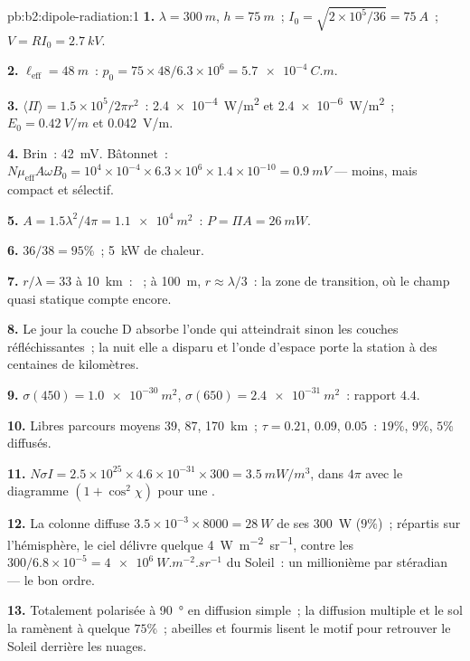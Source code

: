 \begin{solution}{pb:b2:dipole-radiation:1}
\textbf{1.} $\lambda = \qty{300}{m}$, $h = \qty{75}{m}$~; $I_0 = \sqrt{2 \times 10^5/36} = \qty{75}{A}$~;
$V = RI_0 = \qty{2.7}{kV}$.

\textbf{2.} $\ell_{\text{eff}} = \qty{48}{m}$~: $p_0 = 75 \times 48/6.3 \times 10^6 = \qty{5.7e-4}{C.m}$.

\textbf{3.} $\langle\Pi\rangle = 1.5 \times 10^5/2\pi r^2$~: \qty{2.4e-4}{W/m^2} et \qty{2.4e-6}{W/m^2}~;
$E_0 = \qty{0.42}{V/m}$ et \qty{0.042}{V/m}.

\textbf{4.} Brin~: \qty{42}{mV}. Bâtonnet~: $N\mu_{\text{eff}}A\omega B_0 = 10^4 \times 10^{-4} \times 6.3 \times
10^6 \times 1.4 \times 10^{-10} = \qty{0.9}{mV}$ --- moins, mais compact et sélectif.

\textbf{5.} $A = 1.5\lambda^2/4\pi = \qty{1.1e4}{m^2}$~: $P = \Pi A = \qty{26}{mW}$.

\textbf{6.} $36/38 = 95\%$~; \qty{5}{kW} de chaleur.

\textbf{7.} $r/\lambda = 33$ à \qty{10}{km}~: ~; à \qty{100}{m},
$r \approx \lambda/3$~: la zone de transition, où le champ quasi statique compte
encore.

\textbf{8.} Le jour la couche D absorbe l'onde qui atteindrait sinon
les couches réfléchissantes~; la nuit elle a disparu et l'onde d'espace
porte la station à des centaines de kilomètres.

\textbf{9.} $\sigma(450) = \qty{1.0e-30}{m^2}$, $\sigma(650) = \qty{2.4e-31}{m^2}$~: rapport $4.4$.

\textbf{10.} Libres parcours moyens $39$, $87$, \qty{170}{km}~; $\tau = 0.21$, $0.09$, $0.05$~:
$19\%$, $9\%$, $5\%$ diffusés.

\textbf{11.} $N\sigma I = 2.5 \times 10^{25} \times 4.6 \times 10^{-31} \times 300 = \qty{3.5}{mW/m^3}$,
dans $4\pi$ avec le diagramme $(1 + \cos^2\chi)$ pour une .

\textbf{12.} La colonne diffuse $3.5 \times 10^{-3} \times 8000 = \qty{28}{W}$ de ses
\qty{300}{W} ($9\%$)~; répartis sur l'hémisphère, le ciel délivre quelque
\qty{4}{W.m^{-2}.sr^{-1}}, contre les $300/6.8 \times 10^{-5} = \qty{4e6}{W.m^{-2}.sr^{-1}}$ du Soleil~:
un millionième par stéradian --- le bon ordre.

\textbf{13.} Totalement polarisée à \qty{90}{\degree} en diffusion simple~; la diffusion
multiple et le sol la ramènent à quelque $75\%$~; abeilles et fourmis lisent
le motif pour retrouver le Soleil derrière les nuages.


\end{solution}
